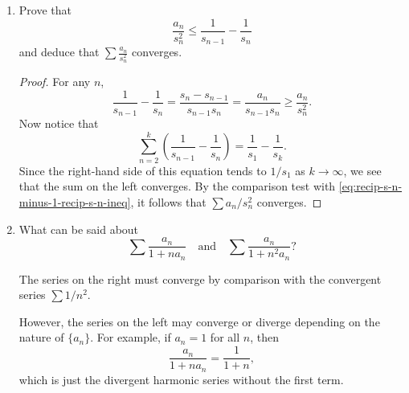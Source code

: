 \begin{enumerate}
\begin{proof}
    Now, since $s_n$ is monotonic, it cannot be bounded (for
    otherwise $\sum a_n$ would converge). So for any fixed $N>0$, we may
    find a positive integer $k$ so that
    \begin{equation*}
      s_{N+k} > 2s_N.
    \end{equation*}
    Then
    \begin{equation*}
      \sum_{n=1}^k\frac{a_{N+n}}{s_{N+n}}
      \geq 1 - \frac{s_N}{s_{N+k}} \geq 1 - \frac12 = \frac12.
    \end{equation*}
    Therefore $\sum a_n/s_n$ diverges by the Cauchy criterion.
  \end{proof}
\item Prove that
  \begin{equation*}
    \frac{a_n}{s_n^2}\leq\frac1{s_{n-1}} - \frac1{s_n}
  \end{equation*}
  and deduce that $\displaystyle\sum\frac{a_n}{s_n^2}$ converges.
  \begin{proof}
    For any $n$,
    \begin{equation}
      \label{eq:recip-s-n-minus-1-recip-s-n-ineq}
      \frac1{s_{n-1}}-\frac1{s_n} = \frac{s_n - s_{n-1}}{s_{n-1}s_n}
      = \frac{a_n}{s_{n-1}s_n} \geq \frac{a_n}{s_n^2}.
    \end{equation}
    Now notice that
    \begin{equation*}
      \sum_{n=2}^k\left(\frac1{s_{n-1}} - \frac1{s_n}\right)
      = \frac1{s_1} - \frac1{s_k}.
    \end{equation*}
    Since the right-hand side of this equation tends to $1/s_1$ as
    $k\to\infty$, we see that the sum on the left converges. By the
    comparison test with \eqref{eq:recip-s-n-minus-1-recip-s-n-ineq},
    it follows that $\sum a_n/s_n^2$ converges.
  \end{proof}
\item What can be said about
  \begin{equation*}
    \sum\frac{a_n}{1 + na_n}
    \quad\text{and}\quad
    \sum\frac{a_n}{1 + n^2a_n}?
  \end{equation*}
  \begin{solution}
    The series on the right must converge by comparison with the
    convergent series $\sum1/n^2$.

    However, the series on the left may converge or diverge depending
    on the nature of $\{a_n\}$. For example, if $a_n = 1$ for all $n$,
    then
    \begin{equation*}
      \frac{a_n}{1 + na_n} = \frac1{1 + n},
    \end{equation*}
    which is just the divergent harmonic series without the first
    term.


\end{solution}
\end{enumerate}
